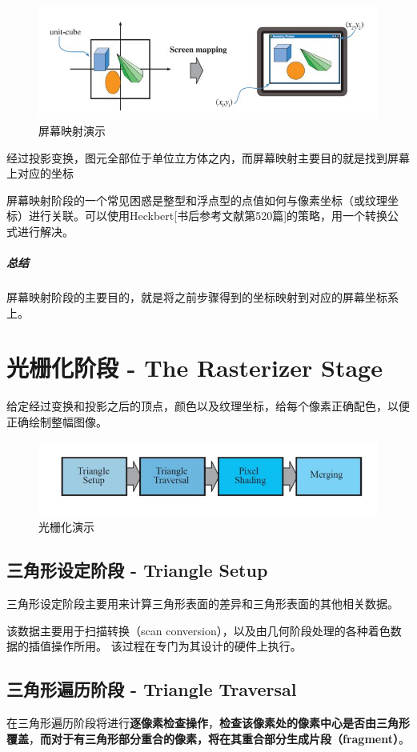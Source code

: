 \documentclass[UTF8,a4paper,12pt]{ctexbook}
\begin{document}
				\begin{figure}[H]
					\centering
					\includegraphics[scale=0.57]{scMap}
					\caption{屏幕映射演示}
				\end{figure}
	
			经过投影变换，图元全部位于单位立方体之内，而屏幕映射主要目的就是找到屏幕上对应的坐标
			
			屏幕映射阶段的一个常见困惑是整型和浮点型的点值如何与像素坐标（或纹理坐标）进行关联。可以使用Heckbert[书后参考文献第520篇]的策略，用一个转换公式进行解决。
			
			\subparagraph{总结}屏幕映射阶段的主要目的，就是将之前步骤得到的坐标映射到对应的屏幕坐标系上。
			
	\section{光栅化阶段 - The Rasterizer Stage}
		给定经过变换和投影之后的顶点，颜色以及纹理坐标，给每个像素正确配色，以便正确绘制整幅图像。
			\begin{figure}[H]
				\centering
				\includegraphics[scale=0.7]{Rasterization}
				\caption{光栅化演示}
			\end{figure}
			
			\subsection{三角形设定阶段 - Triangle Setup}
				三角形设定阶段主要用来计算三角形表面的差异和三角形表面的其他相关数据。
				
				该数据主要用于扫描转换（scan conversion），以及由几何阶段处理的各种着色数据的插值操作所用。 该过程在专门为其设计的硬件上执行。
				 
			\subsection{三角形遍历阶段 - Triangle Traversal}
				在三角形遍历阶段将进行\textbf{逐像素检查操作}，\textbf{检查该像素处的像素中心是否由三角形覆盖}，\textbf{而对于有三角形部分重合的像素，将在其重合部分生成片段（fragment）}。
				
\end{document}
